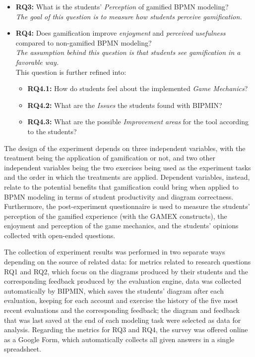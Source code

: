 \begin{itemize}
\begin{itemize}
    \end{itemize}
    \item \textbf{RQ3:} What is the students' \textit{Perception} of gamified BPMN modeling?\\
    \emph{The goal of this question is to measure how students perceive gamification.}
    \item \textbf{RQ4:} Does gamification improve \textit{enjoyment} and \textit{perceived usefulness} compared to non-gamified BPMN modeling?\\
    \emph{The assumption behind this question is that students see gamification in a favorable way.}\\
    This question is further refined into:
    \begin{itemize}
        \item \textbf{RQ4.1:} How do students feel about the implemented \textit{Game Mechanics}?
        \item \textbf{RQ4.2:} What are the \textit{Issues} the students found with BIPMIN?
        \item \textbf{RQ4.3:} What are the possible \textit{Improvement areas} for the tool according to the students?
    \end{itemize}
\end{itemize}


The design of the experiment depends on three independent variables, with the treatment being the application of gamification or not, and two other independent variables being the two exercises being used as the experiment tasks and the order in which the treatments are applied. Dependent variables, instead, relate to the potential benefits that gamification could bring when applied to BPMN modeling in terms of student productivity and diagram correctness. Furthermore, the post-experiment questionnaire is used to measure the students' perception of the gamified experience (with the GAMEX constructs), the enjoyment and perception of the game mechanics, and the students' opinions collected with open-ended questions.

The collection of experiment results was performed in two separate ways depending on the source of related data: for metrics related to research questions RQ1 and RQ2, which focus on the diagrams produced by their students and the corresponding feedback produced by the evaluation engine, data was collected automatically by BIPMIN, which saves the students' diagram after each evaluation, keeping for each account and exercise the history of the five most recent evaluations and the corresponding feedback; the diagram and feedback that was last saved at the end of each modeling task were selected as data for analysis.
Regarding the metrics for RQ3 and RQ4, the survey was offered online as a Google Form, which automatically collects all given answers in a single spreadsheet.

